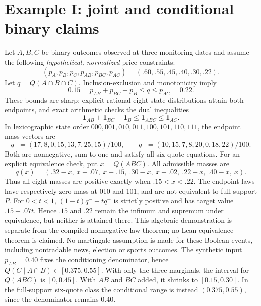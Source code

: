 \documentclass[11pt]{article}
\newcommand{\one}{\mathbf{1}}
\begin{document}
\section{Example I: joint and conditional binary claims}
Let $A,B,C$ be binary outcomes observed at three monitoring dates and
assume the following \emph{hypothetical, normalized} price constraints:
\begin{equation}
(p_A,p_B,p_C,p_{AB},p_{BC},p_{AC})=(.60,.55,.45,.40,.30,.22).
\end{equation}
Let $q=Q(A\cap B\cap C)$. Inclusion-exclusion and monotonicity imply
\begin{equation}
0.15=p_{AB}+p_{BC}-p_B\le q\le p_{AC}=0.22.
\end{equation}
These bounds are sharp: explicit rational eight-state distributions attain
both endpoints, and exact arithmetic checks the dual inequalities
\begin{equation}
\one_{AB}+\one_{BC}-\one_B\le\one_{ABC}\le\one_{AC}.
\end{equation}
In lexicographic state order $000,001,010,011,100,101,110,111$, the endpoint
mass vectors are
\[
q^-=(17,8,0,15,13,7,25,15)/100,\qquad
q^+=(10,15,7,8,20,0,18,22)/100.
\]
Both are nonnegative, sum to one and satisfy all six quote equations.
For an explicit equivalence check, put $x=Q(ABC)$. All admissible masses are
\[
q(x)=(.32-x,\ x-.07,\ x-.15,\ .30-x,\ x-.02,\ .22-x,\ .40-x,\ x).
\]
Thus all eight masses are positive exactly when $.15<x<.22$.
The endpoint laws have respectively zero mass at 010 and 101, and are not
equivalent to full-support $P$. For $0<t<1$, $(1-t)q^-+tq^+$ is strictly
positive and has target value $.15+.07t$. Hence $.15$ and $.22$ remain
the infimum and supremum under equivalence, but neither is attained there.
This algebraic demonstration is separate from the compiled nonnegative-law
theorem; no Lean equivalence theorem is claimed.
No martingale assumption is made for these Boolean events, including
nontradable news, election or sports outcomes.
The synthetic input $p_{AB}=0.40$ fixes the conditioning denominator, hence
$Q(C\mid A\cap B)\in[0.375,0.55]$. With only the three marginals,
the interval for $Q(ABC)$ is $[0,0.45]$. With $AB$ and $BC$ added,
it shrinks to $[0.15,0.30]$.
In the full-support six-quote class the conditional range is instead
$(0.375,0.55)$, since the denominator remains $0.40$.
\end{document}
